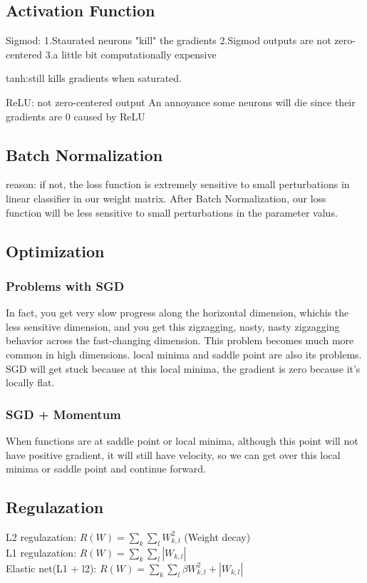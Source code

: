 \documentclass{article}
\begin{document}
\subsection{Activation Function}
Sigmod: 1.Staurated neurons "kill" the gradients
		2.Sigmod outputs are not zero-centered
		3.a little bit computationally expensive
		
tanh:still kills gradients when saturated.

ReLU: not zero-centered output
		An annoyance
		some neurons will die since their gradients are 0 caused by ReLU
\subsection{Batch Normalization}
reason: if not, the loss function is extremely sensitive to small perturbations in linear classifier in our weight matrix. After Batch Normalization, our loss function will be less sensitive to small perturbations in the parameter valus.

\subsection{Optimization}
\subsubsection{Problems with SGD}
In fact, you get very slow progress along the horizontal dimension, whichis the less sensitive dimension, and you get this zigzagging,  nasty, nasty zigzagging behavior across the fast-changing dimension. This problem becomes much more common in high dimensions. local minima and saddle point are also its problems. SGD will get stuck because at this local minima, the gradient is zero because it's locally flat.
\subsubsection{SGD + Momentum}
When functions are at saddle point or local minima, although this point will not have positive gradient, it will still have velocity, so we can get over this local minima or saddle point and continue forward.

\subsection{Regulazation}
L2 regulazation: ${\displaystyle R(W)=\sum_k\sum_lW_{k,l}^2}$  (Weight decay)\\
L1 regulazation: ${\displaystyle R(W)=\sum_k\sum_l|W_{k,l}|}$ \\
Elastic net(L1 + l2): ${\displaystyle R(W)=\sum_k\sum_l\beta W_{k,l}^2+|W_{k,l}|}$
\end{document}
